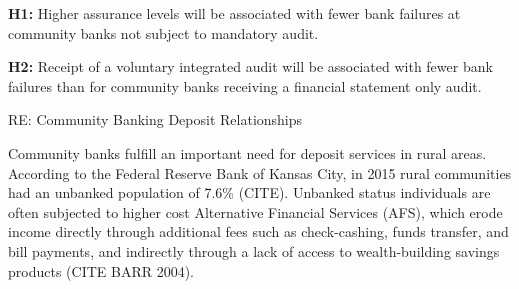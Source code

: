 \documentclass[12pt,letterpaper]{article}
\begin{document}
\textbf{H1:} Higher assurance levels will be associated with fewer bank failures at community banks not subject to mandatory audit.

\textbf{H2:} Receipt of a voluntary integrated audit will be associated with fewer bank failures than for community banks receiving a financial statement only audit.

RE: Community Banking Deposit Relationships

Community banks fulfill an important need for deposit services in rural areas. According to the Federal Reserve Bank of Kansas City, in 2015 rural communities had an unbanked population of 7.6\% (CITE). Unbanked status individuals are often subjected to higher cost Alternative Financial Services (AFS), which erode income directly through additional fees such as check-cashing, funds transfer, and bill payments, and indirectly through a lack of access to wealth-building savings products (CITE BARR 2004).

\printbibliography[title=References]
\end{document}
